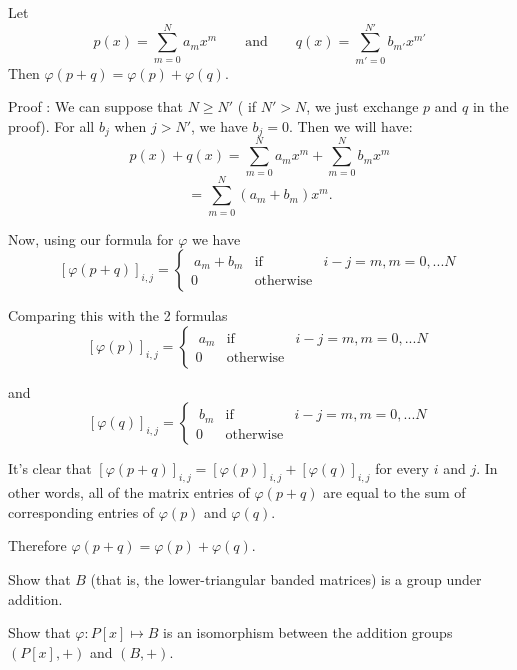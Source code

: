 \begin{prop}{}
	Let  \[p(x) = \sum^ {N}_{m=0} a_{m}x^{m}\qquad \text{and}\qquad q(x) = \sum^ {N'}_{m'=0} b_{m'}x^{m'}\]
	Then $\varphi(p + q) = \varphi(p) + \varphi(q)$.
	
	Proof : We can suppose that $ N \geq N' $ ( if $N'> N$, we just exchange $p$ and $q$ in the proof). For all $b_j$ when $j>N'$, we have $b_j=0$. Then we will have:
	\[p(x) + q(x) = \sum^ {N}_{m=0} a_{m}x^{m} + \sum^{N}_{m=0} b_{m}x^{m}\] 
	\[=\sum^{N}_{m=0}(a_{m} + b_{m})x^{m}.\]

\noindent
Now, using our formula for $\varphi$ we have
\[[\varphi(p + q)]_{i, j} = \left\{\begin{array}{rcl}\ a_m + b_m   &\mbox{if}&   i - j = m,  m = 0,...N \\ 0   &\mbox{otherwise}& \end{array}\right.\]
	
\noindent
Comparing this with the 2 formulas
\[[\varphi(p)]_{i, j} = \left\{\begin{array}{rcl}\ a_m   &\mbox{if}&   i - j = m,  m = 0,...N \\ 0   &\mbox{otherwise}& \end{array}\right.\]
	
\noindent 
and 
\[[\varphi(q)]_{i, j} = \left\{\begin{array}{rcl}\ b_m   &\mbox{if}&   i - j = m,  m = 0,...N \\ 0   &\mbox{otherwise}& \end{array}\right.\]
	
\noindent
It's clear that $[\varphi(p + q)]_{i, j} = [\varphi(p)]_{i, j} + [\varphi(q)]_{i, j}$ for every $i$ and $j$. In other words, all of the matrix entries  of $\varphi(p + q)$ are equal to the sum of corresponding entries of $\varphi(p)$ and $\varphi(q)$.
	
	Therefore $\varphi(p + q) = \varphi(p) + \varphi(q)$.
\end{prop}


\begin{exercise}{}
	Show that $B$  (that is, the lower-triangular banded matrices) is a group under addition.
\end{exercise}

\begin{exercise}{}
	Show that $\varphi : P[x] \mapsto B$ is an isomorphism between the addition groups $( P[x] , +)$ and $(B, +)$.
\end{exercise}

